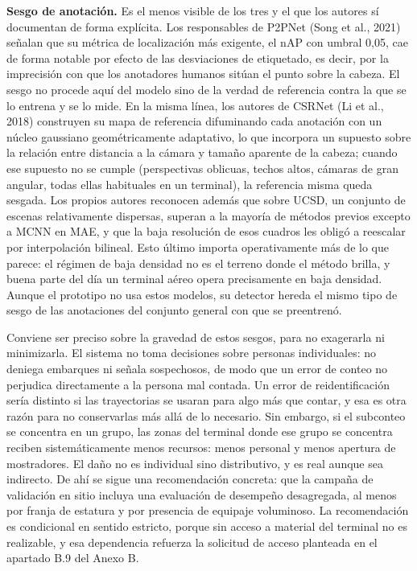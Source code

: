 \textbf{Sesgo de anotación.} Es el menos visible de los tres y el que
los autores sí documentan de forma explícita. Los responsables de P2PNet
(Song et al., 2021) señalan que su métrica de localización más
exigente, el nAP con umbral 0,05, cae de forma notable por efecto de las
desviaciones de etiquetado, es decir, por la imprecisión con que los
anotadores humanos sitúan el punto sobre la cabeza. El sesgo no procede
aquí del modelo sino de la verdad de referencia contra la que se lo
entrena y se lo mide. En la misma línea, los autores de CSRNet
(Li et al., 2018) construyen su mapa de referencia difuminando cada
anotación con un núcleo gaussiano geométricamente adaptativo, lo que
incorpora un supuesto sobre la relación entre distancia a la cámara y
tamaño aparente de la cabeza; cuando ese supuesto no se cumple
(perspectivas oblicuas, techos altos, cámaras de gran angular, todas
ellas habituales en un terminal), la referencia misma queda sesgada. Los
propios autores reconocen además que sobre UCSD, un conjunto de escenas
relativamente dispersas, superan a la mayoría de métodos previos excepto
a MCNN en MAE, y que la baja resolución de esos cuadros les obligó a
reescalar por interpolación bilineal. Esto último importa operativamente
más de lo que parece: el régimen de baja densidad no es el terreno donde
el método brilla, y buena parte del día un terminal aéreo opera
precisamente en baja densidad. Aunque el prototipo no usa estos modelos, su
detector hereda el mismo tipo de sesgo de las anotaciones del conjunto general
con que se preentrenó.

Conviene ser preciso sobre la gravedad de estos sesgos, para no
exagerarla ni minimizarla. El sistema no toma decisiones sobre personas
individuales: no deniega embarques ni señala sospechosos, de modo que un
error de conteo no perjudica directamente a la persona mal contada. Un error
de reidentificación sería distinto si las trayectorias se usaran para algo más
que contar, y esa es otra razón para no conservarlas más allá de lo
necesario. Sin
embargo, si el subconteo se concentra en un grupo, las zonas del
terminal donde ese grupo se concentra reciben sistemáticamente menos
recursos: menos personal y menos apertura de mostradores. El daño no es
individual sino distributivo, y es real aunque sea indirecto. De ahí se
sigue una recomendación concreta: que la campaña de validación en sitio
incluya una evaluación de desempeño desagregada, al menos por franja de
estatura y por presencia de equipaje voluminoso. La recomendación es
condicional en sentido estricto, porque sin acceso a material del
terminal no es realizable, y esa dependencia refuerza la solicitud de
acceso planteada en el apartado B.9 del Anexo B.

